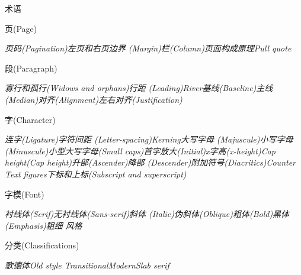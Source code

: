 ﻿\documentclass[hyperref={bookmarks=true},xcolor=pdflatex,svgnames,table,compress]{beamer}
\begin{document}
\begin{frame}{术语}

  {\normalsize 页(Page)}

  {\scriptsize \itshape 页码(Pagination)\textperiodcentered 左页和右页\textperiodcentered 边界
    (Margin)\textperiodcentered 栏(Column)\textperiodcentered 页面构成原理\textperiodcentered Pull
    quote}

  {\normalsize 段(Paragraph)}

  {\scriptsize \itshape 寡行和孤行(Widows and orphans)\textperiodcentered 行距
    (Leading)\textperiodcentered River\textperiodcentered 基线(Baseline)\textperiodcentered 主线
    (Median)\textperiodcentered 对齐(Alignment)\textperiodcentered 左右对齐(Justification)}

  {\normalsize 字(Character)}

  {\scriptsize \itshape 连字(Ligature)\textperiodcentered 字符间距
    (Letter-spacing)\textperiodcentered Kerning\textperiodcentered 大写字母
    (Majuscule)\textperiodcentered 小写字母(Minuscule)\textperiodcentered 小型大写字母(Small
    caps)\textperiodcentered 首字放大(Initial)\textperiodcentered x字高(x-height)\textperiodcentered Cap
    height(Cap height)\textperiodcentered 升部(Ascender)\textperiodcentered 降部
    (Descender)\textperiodcentered 附加符号(Diacritics)\textperiodcentered Counter\textperiodcentered
    Text figures\textperiodcentered 下标和上标(Subscript and superscript)}

  {\normalsize 字模(Font)}

  {\scriptsize \itshape 衬线体(Serif)\textperiodcentered 无衬线体(Sans-serif)\textperiodcentered 斜体
    (Italic)\textperiodcentered 伪斜体(Oblique)\textperiodcentered 粗体(Bold)\textperiodcentered 黑体
    (Emphasis)\textperiodcentered 粗细 \textperiodcentered 风格}

  {\normalsize 分类(Classifications)}

  {\scriptsize \itshape 歌德体\textperiodcentered Old style\textperiodcentered
    Transitional\textperiodcentered Modern\textperiodcentered Slab serif}

\end{frame}
\end{document}
